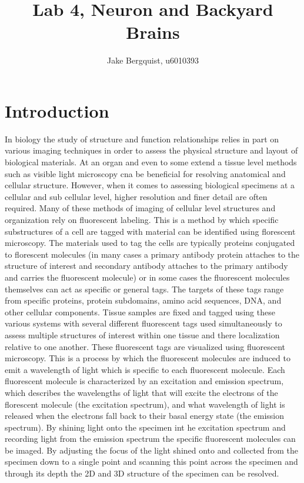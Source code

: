 \documentclass[12pt]{article}
\begin{document}
\title{Lab 4, Neuron and Backyard Brains}
\author{Jake Bergquist, u6010393}
\maketitle
\tableofcontents
\newpage

\section{Introduction}
In biology the study of structure and function relationships relies in part on various imaging techniques in order to assess the physical structure and layout of biological materials. At an organ and even to some extend a tissue level methods such as visible light microscopy cna be beneficial for resolving anatomical and cellular structure. However, when it comes to assessing biological specimens at a cellular and sub cellular level, higher resolution and finer detail are often required. Many of these methods of imaging of cellular level structures and organization rely on fluorescent labeling. This is a method by which specific substructures of a cell are tagged with material can be identified using florescent microscopy. The materials used to tag the cells are typically proteins conjugated to florescent molecules (in many cases a primary antibody protein attaches to the structure of interest and secondary antibody attaches to the primary antibody and carries the fluorescent molecule) or in some cases the fluorescent molecules themselves can act as specific or general tags. The targets of these tags range from specific proteins, protein subdomains, amino acid sequences, DNA, and other cellular components. Tissue samples are fixed and tagged using these various systems with several different fluorescent tags used simultaneously to assess multiple structures of interest within one tissue and there localization relative to one another. These fluorescent tags are visualized using fluorescent microscopy. This is a process by which the fluorescent molecules are induced to emit a wavelength of light which is specific to each fluorescent molecule. Each fluorescent molecule is characterized by an excitation and emission spectrum, which describes the wavelengths of light that will excite the electrons of the florescent molecule (the excitation spectrum), and what wavelength of light is released when the electrons fall back to their basal energy state (the emission spectrum). By shining light onto the specimen int he excitation spectrum and recording light from the emission spectrum the specific fluorescent molecules can be imaged. By adjusting the focus of the light shined onto and collected from the specimen down to a single point and scanning this point across the specimen and through its depth the 2D and 3D structure of the specimen can be resolved.
\end{document}
